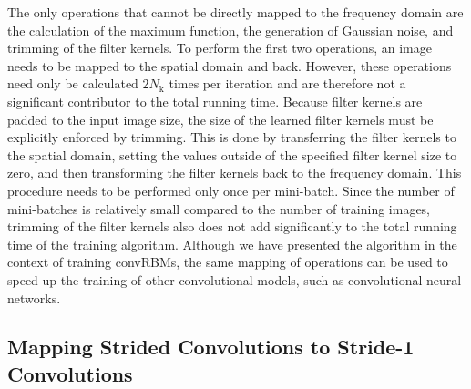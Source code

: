 The only operations that cannot be directly mapped to the frequency domain are
the calculation of the maximum function, the generation of Gaussian noise, and
trimming of the filter kernels. To perform the first two operations, an image
needs to be mapped to the spatial domain and back. However, these operations
need only be calculated $2N_\text{k}$ times per iteration and are therefore not
a significant contributor to the total running time. Because filter kernels are
padded to the input image size, the size of the learned filter kernels must be
explicitly enforced by trimming. This is done by transferring the filter kernels
to the spatial domain, setting the values outside of the specified filter kernel
size to zero, and then transforming the filter kernels back to the frequency
domain. This procedure needs to be performed only once per mini-batch. Since the
number of mini-batches is relatively small compared to the number of training
images, trimming of the filter kernels also does not add significantly to the
total running time of the training algorithm. Although we have presented the
algorithm in the context of training convRBMs, the same mapping of operations
can be used to speed up the training of other convolutional models, such as
convolutional neural networks.

\subsection{Mapping Strided Convolutions to Stride-1 Convolutions}
\label{sec:training:strided}


